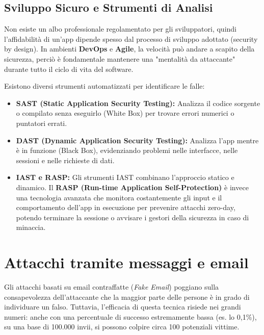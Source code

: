 \documentclass{article}
\begin{document}
\vspace{0.8cm}

\subsection*{Sviluppo Sicuro e Strumenti di Analisi}

Non esiste un albo professionale regolamentato per gli sviluppatori, quindi l'affidabilità di un'app dipende spesso dal processo di sviluppo adottato (security by design). In ambienti \textbf{DevOps} e \textbf{Agile}, la velocità può andare a scapito della sicurezza, perciò è fondamentale mantenere una "mentalità da attaccante" durante tutto il ciclo di vita del software.

Esistono diversi strumenti automatizzati per identificare le falle:

\begin{itemize}
    \item \textbf{SAST (Static Application Security Testing):} Analizza il codice sorgente o compilato senza eseguirlo (White Box) per trovare errori numerici o puntatori errati.
    \item \textbf{DAST (Dynamic Application Security Testing):} Analizza l'app mentre è in funzione (Black Box), evidenziando problemi nelle interfacce, nelle sessioni e nelle richieste di dati.
    \item \textbf{IAST e RASP:} Gli strumenti IAST combinano l'approccio statico e dinamico. Il \textbf{RASP (Run-time Application Self-Protection)} è invece una tecnologia avanzata che monitora costantemente gli input e il comportamento dell'app in esecuzione per prevenire attacchi zero-day, potendo terminare la sessione o avvisare i gestori della sicurezza in caso di minaccia.
\end{itemize}

\vspace{0.8cm}

\section*{Attacchi tramite messaggi e email}

Gli attacchi basati su email contraffatte (\textit{Fake Email}) poggiano sulla consapevolezza dell'attaccante che la maggior parte delle persone è in grado di individuare un falso. Tuttavia, l'efficacia di questa tecnica risiede nei grandi numeri: anche con una percentuale di successo estremamente bassa (es. lo 0,1\%), su una base di 100.000 invii, si possono colpire circa 100 potenziali vittime.
\end{document}

